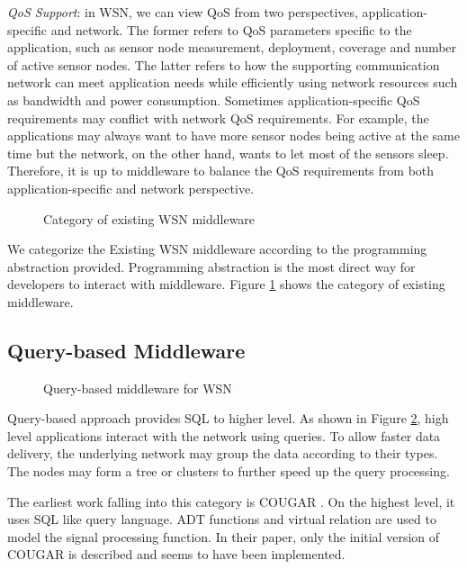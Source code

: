 \emph{QoS Support}: in WSN, we can view QoS from two perspectives, application-specific and network. The former refers to QoS parameters specific to the application, such as sensor node measurement, deployment, coverage and number of active sensor nodes. The latter refers to how the supporting communication network can meet application needs while efficiently using network resources such as bandwidth and power consumption. Sometimes application-specific QoS requirements may conflict with network QoS requirements. For example, the applications may always want to have more sensor nodes being active at the same time but the network, on the other hand, wants to let most of the sensors sleep. Therefore, it is up to middleware to balance the QoS requirements from both application-specific and network perspective.

\begin{figure}
\centering
{}
\caption{Category of existing WSN middleware}
\label{fig:wsn-middleware-category}
\end{figure}

We categorize the Existing WSN middleware according to the programming abstraction provided. Programming abstraction is the most direct way for developers to interact with middleware. Figure \ref{fig:wsn-middleware-category} shows the category of existing middleware.

\subsection{Query-based Middleware}

\begin{figure}
\centering
{}
\caption{Query-based middleware for WSN}
\label{fig:wsn-middleware-query}
\end{figure}

Query-based approach provides SQL to higher level. As shown in Figure \ref{fig:wsn-middleware-query}, high level applications interact with the network using queries. To allow faster data delivery, the underlying network may group the data according to their types. The nodes may form a tree or clusters to further speed up the query processing.

The earliest work falling into this category is COUGAR \cite{cougar}. On the highest level, it uses SQL like query language. ADT functions and virtual relation are used to model the signal processing function. In their paper, only the initial version of COUGAR is described and seems to have been implemented. 

